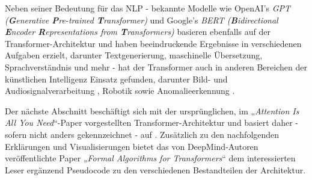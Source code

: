 Neben seiner Bedeutung für das NLP - bekannte Modelle wie OpenAI's \emph{GPT (\textbf{G}enerative \textbf{P}re-trained \textbf{T}ransformer)} \cite{GPT} und Google's \emph{BERT (\textbf{B}idirectional \textbf{E}ncoder \textbf{R}epresentations from \textbf{T}ransformers)} \cite{BERT} basieren ebenfalls auf der Transformer-Architektur und haben beeindruckende Ergebnisse in verschiedenen Aufgaben erzielt, darunter Textgenerierung, maschinelle Übersetzung, Sprachverständnis und mehr - hat der Transformer auch in anderen Bereichen der künstlichen Intelligenz Einsatz gefunden, darunter Bild- \cite{VisionTransformer} und Audiosignalverarbeitung \cite{AudioTransformers}, Robotik \cite{RoboticsTransformer} sowie Anomalieerkennung \cite{Deep_Learning_AD_Time_Series_Data}\cite{VisionTransformer}\cite{TranAD}.

Der nächste Abschnitt beschäftigt sich mit der ursprünglichen, im „\emph{Attention Is All You Need}“-Paper vorgestellten Transformer-Architektur und basiert daher - sofern nicht anders gekennzeichnet - auf \cite{Attention_is_all_you_need}. Zusätzlich zu den nachfolgenden Erklärungen und Visualisierungen bietet das von DeepMind-Autoren veröffentlichte Paper „\emph{Formal Algorithms for Transformers}“ \cite{Formal_Algorithms_for_Transformers_DeepMind} dem interessierten Leser ergänzend Pseudocode zu den verschiedenen Bestandteilen der Architektur. 

